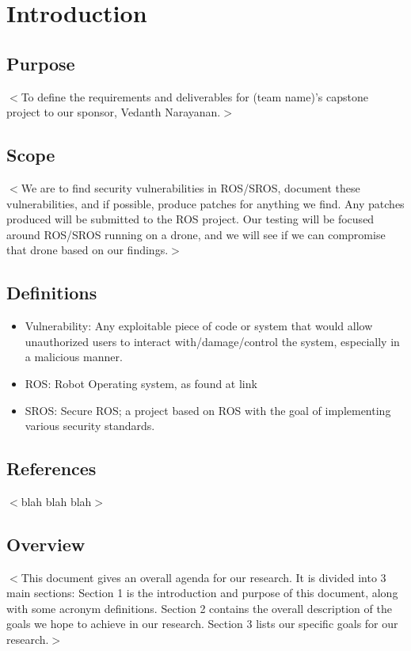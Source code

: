 \documentclass{scrreprt}
\begin{document}
\chapter{Introduction}

\section{Purpose}
$<$To define the requirements and deliverables for (team name)'s capstone project to our sponsor, Vedanth Narayanan.$>$

\section{Scope}
$<$We are to find security vulnerabilities in ROS/SROS, document these vulnerabilities, and if possible, produce patches for anything we find. Any patches produced will be submitted to the ROS project. Our testing will be focused around ROS/SROS running on a drone, and we will see if we can compromise that drone based on our findings.$>$

\section{Definitions}
\begin{itemize}
  \item Vulnerability: Any exploitable piece of code or system that would allow unauthorized users to interact with/damage/control the system, especially in a malicious manner.
  \item ROS: Robot Operating system, as found at link
  \item SROS: Secure ROS; a project based on ROS with the goal of implementing various security standards.
\end{itemize}

\section{References}
$<$blah blah blah$>$

\section{Overview}
$<$This document gives an overall agenda for our research. It is divided into 3 main sections:
Section 1 is the introduction and purpose of this document, along with some acronym definitions.
Section 2 contains the overall description of the goals we hope to achieve in our research.
Section 3 lists our specific goals for our research.$>$
\end{document}
